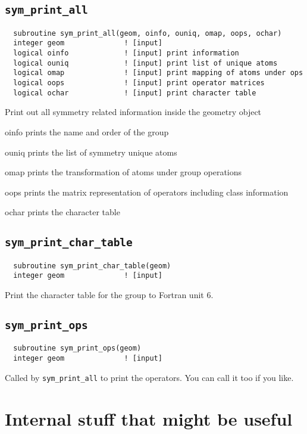 \subsection{{\tt sym\_print\_all}}
\begin{verbatim}
  subroutine sym_print_all(geom, oinfo, ouniq, omap, oops, ochar)
  integer geom              ! [input]
  logical oinfo             ! [input] print information
  logical ouniq             ! [input] print list of unique atoms
  logical omap              ! [input] print mapping of atoms under ops
  logical oops              ! [input] print operator matrices
  logical ochar             ! [input] print character table
\end{verbatim}
Print out all symmetry related information inside the geometry object
\begin{description}
\item{oinfo} prints the name and order of the group
\item{ouniq} prints the list of symmetry unique atoms
\item{omap} prints the transformation of atoms under group operations
\item{oops} prints the matrix representation of operators including
  class information
\item{ochar} prints the character table
\end{description}

\subsection{{\tt sym\_print\_char\_table}}
\begin{verbatim}
  subroutine sym_print_char_table(geom)
  integer geom              ! [input]
\end{verbatim}
Print the character table for the group to Fortran unit 6.


\subsection{{\tt sym\_print\_ops}}
\begin{verbatim}
  subroutine sym_print_ops(geom)
  integer geom              ! [input]
\end{verbatim}
Called by \verb+sym_print_all+ to print the operators.  You can call
it too if you like.

\section{Internal stuff that might be useful}

